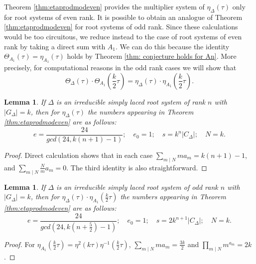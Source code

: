 \documentclass{article}
\newtheorem{lemma}[theorem]{Lemma}
\theoremstyle{definition}
\begin{document}
Theorem \ref{thm:etaprodmodeven} provides the multiplier system of $\eta_{\Delta}(\tau)$ only for root systems of even rank. It is possible to obtain an analogue of Theorem \ref{thm:etaprodmodeven} for root systems of odd rank. Since these calculations would be too circuitous, we reduce instead to the case of root systems of even rank by taking a direct sum with $A_1$. We can do this because the identity $\Theta_{A_1}(\tau)=\eta_{A_1}(\tau)$ holds by Theorem \ref{thm: conjecture holds for An}. More precisely, for computational reasons in the odd rank cases we will show that
\[\Theta_{\Delta}(\tau)\cdot \Theta_{A_1}\left(\frac{k}{2}\tau\right)=\eta_{\Delta}(\tau)\cdot \eta_{A_1}\left(\frac{k}{2}\tau\right).\]	
\begin{lemma}
	\label{lem:ee0s}
	If $\Delta$ is an irreducible simply laced root system of rank $n$ with $|G_{\Delta}|=k$, then for $\eta_{\Delta}(\tau)$ the numbers appearing in Theorem \ref{thm:etaprodmodeven}	 are as follows:
	\[ e=\frac{24}{gcd(24, k(n+1)-1)}; \quad e_0=1; \quad s=k^n|C_{\Delta}|; \quad N=k. \]
\end{lemma}
\begin{proof} Direct calculation shows that in each case $\sum_{m \mid N} ma_m=k(n+1)-1$, and $\sum_{m \mid N} \frac{N}{m}a_m=0$. The third identity is also straightforward.
\end{proof}
\begin{lemma}
	\label{lem:ee0sa1}
	If $\Delta$ is an irreducible simply laced root system of odd rank $n$ with $|G_{\Delta}|=k$, then for $\eta_{\Delta}(\tau) \cdot \eta_{A_1}(\frac{k}{2}\tau)$ the numbers appearing in Theorem \ref{thm:etaprodmodeven} are as follows:
	\[ e=\frac{24}{gcd(24, k(n+\frac{5}{2})-1)}; \quad e_0=1; \quad s=2k^{n+1}|C_{\Delta}|; \quad N=k. \]
\end{lemma}
\begin{proof} For $\eta_{A_1}(\frac{k}{2}\tau)=\eta^2(k\tau)\eta^{-1}(\frac{k}{2}\tau)$, $\sum_{m \mid N} ma_m=\frac{3k}{2}$ and $\prod_{m \mid N} m^{a_m}=2k$. \end{proof}
\end{document}

